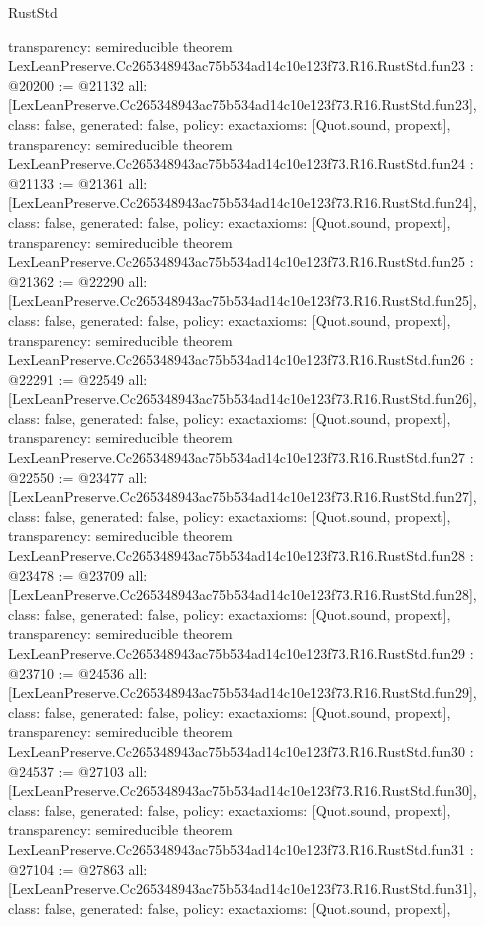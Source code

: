 \begin{lexlean}{RustStd}
\begin{coremodule}
{  transparency: semireducible
}
theorem LexLeanPreserve.Cc265348943ac75b534ad14c10e123f73.R16.RustStd.fun23 : @20200 := @21132 {
  all: [LexLeanPreserve.Cc265348943ac75b534ad14c10e123f73.R16.RustStd.fun23],
  class: false,
  generated: false,
  policy: exact{axioms: [Quot.sound, propext]},
  transparency: semireducible
}
theorem LexLeanPreserve.Cc265348943ac75b534ad14c10e123f73.R16.RustStd.fun24 : @21133 := @21361 {
  all: [LexLeanPreserve.Cc265348943ac75b534ad14c10e123f73.R16.RustStd.fun24],
  class: false,
  generated: false,
  policy: exact{axioms: [Quot.sound, propext]},
  transparency: semireducible
}
theorem LexLeanPreserve.Cc265348943ac75b534ad14c10e123f73.R16.RustStd.fun25 : @21362 := @22290 {
  all: [LexLeanPreserve.Cc265348943ac75b534ad14c10e123f73.R16.RustStd.fun25],
  class: false,
  generated: false,
  policy: exact{axioms: [Quot.sound, propext]},
  transparency: semireducible
}
theorem LexLeanPreserve.Cc265348943ac75b534ad14c10e123f73.R16.RustStd.fun26 : @22291 := @22549 {
  all: [LexLeanPreserve.Cc265348943ac75b534ad14c10e123f73.R16.RustStd.fun26],
  class: false,
  generated: false,
  policy: exact{axioms: [Quot.sound, propext]},
  transparency: semireducible
}
theorem LexLeanPreserve.Cc265348943ac75b534ad14c10e123f73.R16.RustStd.fun27 : @22550 := @23477 {
  all: [LexLeanPreserve.Cc265348943ac75b534ad14c10e123f73.R16.RustStd.fun27],
  class: false,
  generated: false,
  policy: exact{axioms: [Quot.sound, propext]},
  transparency: semireducible
}
theorem LexLeanPreserve.Cc265348943ac75b534ad14c10e123f73.R16.RustStd.fun28 : @23478 := @23709 {
  all: [LexLeanPreserve.Cc265348943ac75b534ad14c10e123f73.R16.RustStd.fun28],
  class: false,
  generated: false,
  policy: exact{axioms: [Quot.sound, propext]},
  transparency: semireducible
}
theorem LexLeanPreserve.Cc265348943ac75b534ad14c10e123f73.R16.RustStd.fun29 : @23710 := @24536 {
  all: [LexLeanPreserve.Cc265348943ac75b534ad14c10e123f73.R16.RustStd.fun29],
  class: false,
  generated: false,
  policy: exact{axioms: [Quot.sound, propext]},
  transparency: semireducible
}
theorem LexLeanPreserve.Cc265348943ac75b534ad14c10e123f73.R16.RustStd.fun30 : @24537 := @27103 {
  all: [LexLeanPreserve.Cc265348943ac75b534ad14c10e123f73.R16.RustStd.fun30],
  class: false,
  generated: false,
  policy: exact{axioms: [Quot.sound, propext]},
  transparency: semireducible
}
theorem LexLeanPreserve.Cc265348943ac75b534ad14c10e123f73.R16.RustStd.fun31 : @27104 := @27863 {
  all: [LexLeanPreserve.Cc265348943ac75b534ad14c10e123f73.R16.RustStd.fun31],
  class: false,
  generated: false,
  policy: exact{axioms: [Quot.sound, propext]},
}
\end{coremodule}
\end{lexlean}
